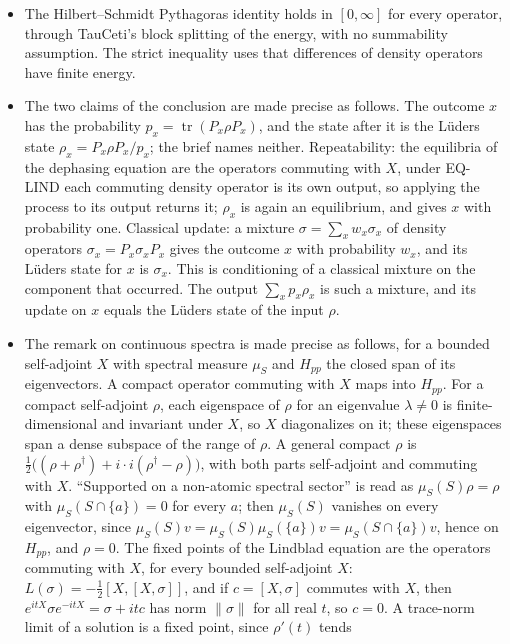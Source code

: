 \documentclass[11pt]{article}
\begin{document}
\begin{itemize}
\item The Hilbert--Schmidt Pythagoras identity holds in $[0, \infty]$ for every operator, through
  TauCeti's block splitting of the energy, with no summability assumption. The strict inequality
  uses that differences of density operators have finite energy.
\item The two claims of the conclusion are made precise as follows. The outcome $x$ has the
  probability $p_x = \operatorname{tr}(P_x\rho P_x)$, and the state after it is the L\"uders state
  $\rho_x = P_x\rho P_x/p_x$; the brief names neither. Repeatability: the equilibria of the
  dephasing equation are the operators commuting with $X$, under EQ-LIND each commuting density
  operator is its own output, so applying the process to its output returns it; $\rho_x$ is again
  an equilibrium, and gives $x$ with probability one. Classical update: a mixture
  $\sigma = \sum_x w_x\sigma_x$ of density operators $\sigma_x = P_x\sigma_xP_x$ gives the outcome
  $x$ with probability $w_x$, and its L\"uders state for $x$ is $\sigma_x$. This is conditioning
  of a classical mixture on the component that occurred. The output $\sum_x p_x\rho_x$ is such a
  mixture, and its update on $x$ equals the L\"uders state of the input $\rho$.
\item The remark on continuous spectra is made precise as follows, for a bounded self-adjoint
  $X$ with spectral measure $\mu_S$ and $H_{pp}$ the closed span of its eigenvectors. A compact
  operator commuting with $X$ maps into $H_{pp}$. For a compact self-adjoint $\rho$, each
  eigenspace of $\rho$ for an eigenvalue $\lambda \ne 0$ is finite-dimensional and invariant
  under $X$, so $X$ diagonalizes on it; these eigenspaces span a dense subspace of the range of
  $\rho$. A general compact $\rho$ is $\frac12\bigl((\rho + \rho^\dagger) +
  i\cdot i(\rho^\dagger - \rho)\bigr)$, with both parts self-adjoint and commuting with $X$.
  ``Supported on a non-atomic spectral sector'' is read as $\mu_S(S)\rho = \rho$ with
  $\mu_S(S \cap \{a\}) = 0$ for every $a$; then $\mu_S(S)$ vanishes on every eigenvector, since
  $\mu_S(S)v = \mu_S(S)\mu_S(\{a\})v = \mu_S(S \cap \{a\})v$, hence on $H_{pp}$, and $\rho = 0$.
  The fixed points of the Lindblad equation are the operators commuting with $X$, for every
  bounded self-adjoint $X$: $L(\sigma) = -\frac12[X, [X, \sigma]]$, and if $c = [X, \sigma]$
  commutes with $X$, then $e^{itX}\sigma e^{-itX} = \sigma + itc$ has norm $\|\sigma\|$ for all
  real $t$, so $c = 0$. A trace-norm limit of a solution is a fixed point, since $\rho'(t)$ tends

\end{itemize}
\end{document}
